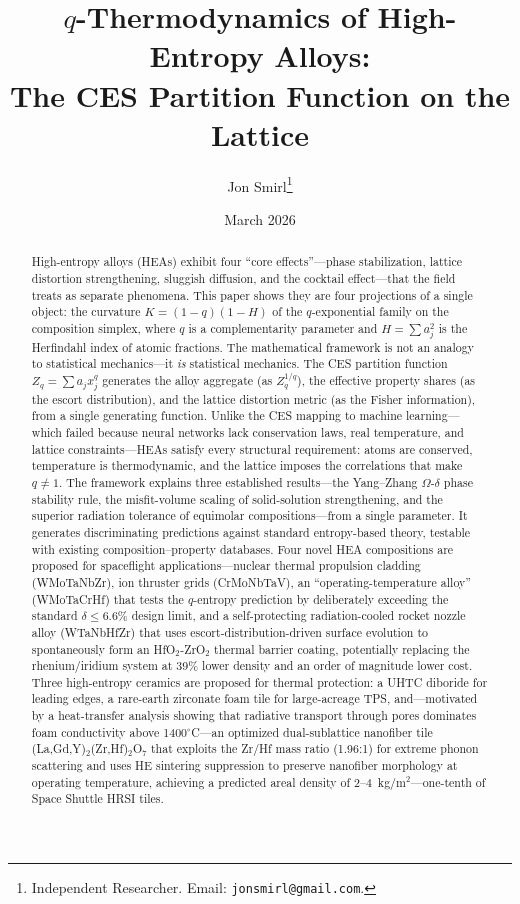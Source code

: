 \documentclass[12pt,letterpaper]{article}
\title{$q$-Thermodynamics of High-Entropy Alloys:\\
The CES Partition Function on the Lattice}
\author{Jon Smirl\thanks{Independent Researcher. Email: \texttt{jonsmirl@gmail.com}.}}
\date{March 2026}
\theoremstyle{definition}
\begin{document}
\maketitle

\begin{abstract}
High-entropy alloys (HEAs) exhibit four ``core effects''---phase stabilization, lattice distortion strengthening, sluggish diffusion, and the cocktail effect---that the field treats as separate phenomena.  This paper shows they are four projections of a single object: the curvature $K = (1 - q)(1 - H)$ of the $q$-exponential family on the composition simplex, where $q$ is a complementarity parameter and $H = \sum a_j^2$ is the Herfindahl index of atomic fractions.  The mathematical framework is not an analogy to statistical mechanics---it \emph{is} statistical mechanics.  The CES partition function $Z_q = \sum a_j x_j^q$ generates the alloy aggregate (as $Z_q^{1/q}$), the effective property shares (as the escort distribution), and the lattice distortion metric (as the Fisher information), from a single generating function.  Unlike the CES mapping to machine learning---which failed because neural networks lack conservation laws, real temperature, and lattice constraints---HEAs satisfy every structural requirement: atoms are conserved, temperature is thermodynamic, and the lattice imposes the correlations that make $q \neq 1$.  The framework explains three established results---the Yang--Zhang $\Omega$-$\delta$ phase stability rule, the misfit-volume scaling of solid-solution strengthening, and the superior radiation tolerance of equimolar compositions---from a single parameter.  It generates discriminating predictions against standard entropy-based theory, testable with existing composition--property databases.  Four novel HEA compositions are proposed for spaceflight applications---nuclear thermal propulsion cladding (WMoTaNbZr), ion thruster grids (CrMoNbTaV), an ``operating-temperature alloy'' (WMoTaCrHf) that tests the $q$-entropy prediction by deliberately exceeding the standard $\delta \leq 6.6\%$ design limit, and a self-protecting radiation-cooled rocket nozzle alloy (WTaNbHfZr) that uses escort-distribution-driven surface evolution to spontaneously form an HfO$_2$-ZrO$_2$ thermal barrier coating, potentially replacing the rhenium/iridium system at 39\% lower density and an order of magnitude lower cost.  Three high-entropy ceramics are proposed for thermal protection: a UHTC diboride for leading edges, a rare-earth zirconate foam tile for large-acreage TPS, and---motivated by a heat-transfer analysis showing that radiative transport through pores dominates foam conductivity above 1400$^\circ$C---an optimized dual-sublattice nanofiber tile (La,Gd,Y)$_2$(Zr,Hf)$_2$O$_7$ that exploits the Zr/Hf mass ratio (1.96:1) for extreme phonon scattering and uses HE sintering suppression to preserve nanofiber morphology at operating temperature, achieving a predicted areal density of 2--4~kg/m$^2$---one-tenth of Space Shuttle HRSI tiles.
\end{abstract}
\end{document}
